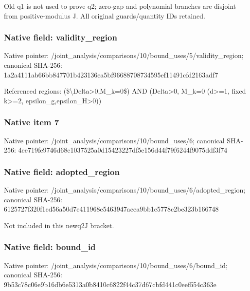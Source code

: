 \documentclass[10pt,a4paper]{article}
\begin{document}
\begingroup\raggedright\sloppy Old q1 is not used to prove q2;\allowbreak{} zero-gap and polynomial branches are disjoint from positive-modulus J. All original guards/\allowbreak{}quantity IDs retained.\par\endgroup

\subsubsection{Native field: validity\_\allowbreak{}region}
Native pointer: /joint\_\allowbreak{}analysis/comparisons/10/bound\_\allowbreak{}uses/5/validity\_\allowbreak{}region; canonical SHA-256: 1a2a4111ab66bb847701b423136ea5bf96688708734595ef11491cfd2163adf7

\begingroup\raggedright\sloppy Referenced regions:\allowbreak{} (\$\textbackslash{}Delta>0,\allowbreak{}M\_\allowbreak{}k=\allowbreak{}0\$) AND (Delta>0,\allowbreak{} M\_\allowbreak{}k=\allowbreak{}0 (d>=\allowbreak{}1,\allowbreak{} fixed k>=\allowbreak{}2,\allowbreak{} epsilon\_\allowbreak{}g,\allowbreak{}epsilon\_\allowbreak{}H>0))\par\endgroup

\subsubsection{Native item 7}
Native pointer: /joint\_\allowbreak{}analysis/comparisons/10/bound\_\allowbreak{}uses/6; canonical SHA-256: 4ee719fe9746d68c1037525a0d15423227df5e156d44f79f6244f9075ddf3f74

\subsubsection{Native field: adopted\_\allowbreak{}region}
Native pointer: /joint\_\allowbreak{}analysis/comparisons/10/bound\_\allowbreak{}uses/6/adopted\_\allowbreak{}region; canonical SHA-256: 6125727f320f1cd56a50d7e411968e5463947acea9bb1e5778c2be323b166748

\begingroup\raggedright\sloppy Not included in this newq2J bracket.\par\endgroup

\subsubsection{Native field: bound\_\allowbreak{}id}
Native pointer: /joint\_\allowbreak{}analysis/comparisons/10/bound\_\allowbreak{}uses/6/bound\_\allowbreak{}id; canonical SHA-256: 9b53c78c06e9b16db6e5313a0b8410c6822f44c37d67cbfd441c0eef554c363e
\end{document}
